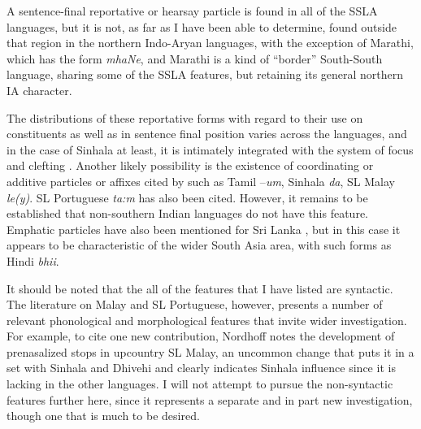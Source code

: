 A sentence-final reportative or hearsay particle is found in all of the SSLA languages, but it is not, as far as I have been able to determine, found outside that region  in the northern Indo-Aryan languages, with the exception of Marathi, which has the form \textit{mhaNe}, \citep[19]{Bashir2006} 
and  Marathi is a kind of ``border'' South-South language, sharing some of the SSLA features, but retaining its general northern IA character.

The distributions of these reportative forms with regard to their use on constituents as well as in sentence final position varies across the languages, and in the case of Sinhala at least, it is intimately integrated with the system of focus and clefting \citep{Gair1986,Gair1994,Gair1997,Gair2009}.
Another likely possibility is the existence of coordinating or additive particles or affixes cited by \citet[143]{Bakker2006} such as Tamil --\textit{um}, Sinhala \textit{da}, SL Malay \textit{le(y)}.  SL Portuguese \textit{ta:m} has also  been cited. However, it remains to be established that non-southern Indian languages do not have this feature.
Emphatic particles have also been mentioned for Sri Lanka \citep[as in][142-3]{Bakker2006}, but in this case it appears to be characteristic of the wider South Asia area, with such forms as Hindi \textit{bhii}. 

It should be noted that the all of the features that I have listed are syntactic. The literature on Malay and SL Portuguese, however, presents a number of relevant phonological and morphological features that invite wider investigation. For example, to cite one new contribution, Nordhoff notes the development of prenasalized stops in upcountry SL Malay, an uncommon change that puts it in a set with Sinhala and Dhivehi and clearly indicates Sinhala influence since it is lacking in the other languages. I will not attempt to pursue the non-syntactic features further here, since it represents a separate and in part new investigation, though one that is much to be desired.

